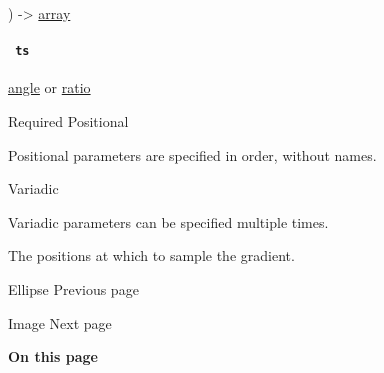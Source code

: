 ) -\textgreater{} \href{/docs/reference/foundations/array/}{array}

\paragraph{\texorpdfstring{\texttt{\ ts\ }}{ ts }}\label{definitions-samples-ts}

\href{/docs/reference/layout/angle/}{angle} {or}
\href{/docs/reference/layout/ratio/}{ratio}

{Required} {{ Positional }}

\label{definitions-samples-ts-positional-tooltip}
Positional parameters are specified in order, without names.

{{ Variadic }}

\label{definitions-samples-ts-variadic-tooltip}
Variadic parameters can be specified multiple times.

The positions at which to sample the gradient.

\href{/docs/reference/visualize/ellipse/}{\pandocbounded{}}

{ Ellipse } { Previous page }

\href{/docs/reference/visualize/image/}{\pandocbounded{}}

{ Image } { Next page }

\textbf{On this page}

